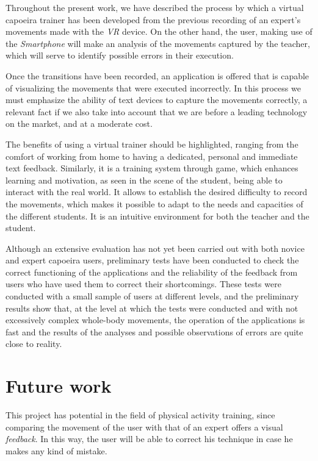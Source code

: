 Throughout the present work, we have described the process by which a virtual capoeira trainer has been developed from the previous recording of an expert's movements made with the \textit{VR} device. On the other hand, the user, making use of the \textit{Smartphone} will make an analysis of the movements captured by the teacher, which will serve to identify possible errors in their execution.

Once the transitions have been recorded, an application is offered that is capable of visualizing the movements that were executed incorrectly. In this process we must emphasize the ability of text devices to capture the movements correctly, a relevant fact if we also take into account that we are before a leading technology on the market, and at a moderate cost.

The benefits of using a virtual trainer should be highlighted, ranging from the comfort of working from home to having a dedicated, personal and immediate text feedback. Similarly, it is a training system through game, which enhances learning and motivation, as seen in the scene of the student, being able to interact with the real world. It allows to establish the desired difficulty to record the movements, which makes it possible to adapt to the needs and capacities of the different students. It is an intuitive environment for both the teacher and the student. 

Although an extensive evaluation has not yet been carried out with both novice and expert capoeira users, preliminary tests have been conducted to check the correct functioning of the applications and the reliability of the feedback from users who have used them to correct their shortcomings. These tests were conducted with a small sample of users at different levels, and the preliminary results show that, at the level at which the tests were conducted and with not excessively complex whole-body movements, the operation of the applications is fast and the results of the analyses and possible observations of errors are quite close to reality.

\section{Future work}

This project has potential in the field of physical activity training, since comparing the movement of the user with that of an expert offers a visual \textit{feedback}. In this way, the user will be able to correct his technique in case he makes any kind of mistake. 

